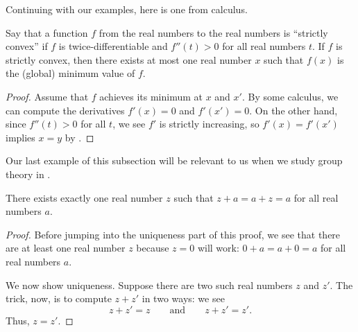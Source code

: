 \documentclass[../notes.tex]{subfiles}
\begin{document}
Continuing with our examples, here is one from calculus.
\begin{example}
    Say that a function $f$ from the real numbers to the real numbers is ``strictly convex'' if $f$ is twice-differentiable and $f''(t) > 0$ for all real numbers $t$. If $f$ is strictly convex, then there exists at most one real number $x$ such that $f(x)$ is the (global) minimum value of $f$.
\end{example}
\begin{proof}
    Assume that $f$ achieves its minimum at $x$ and $x'$.
    By some calculus, we can compute the derivatives $f'(x) = 0$ and $f'(x') = 0$. On the other hand, since $f''(t) > 0$ for all $t$, we see $f'$ is strictly increasing, so $f'(x)=f'(x')$ implies $x=y$ by .
\end{proof}
Our last example of this subsection will be relevant to us when we study group theory in .
\begin{example}
    There exists exactly one real number $z$ such that $z+a=a+z=a$ for all real numbers $a$. %
\end{example}
\begin{proof}
    Before jumping into the uniqueness part of this proof, we see that there are at least one real number $z$ because $z=0$ will work: $0+a=a+0=a$ for all real numbers $a$.

    We now show uniqueness. Suppose there are two such real numbers $z$ and $z'$. The trick, now, is to compute $z+z'$ in two ways: we see
    \[z+z'=z\qquad\text{and}\qquad z+z'=z'.\]
    Thus, $z=z'$.
\end{proof}
\end{document}
